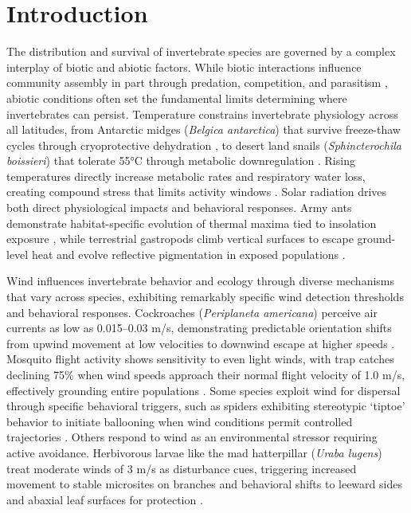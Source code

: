 \section{Introduction}
\label{ch:introduction}

The distribution and survival of invertebrate species are governed by a complex interplay of biotic and abiotic factors. While biotic interactions influence community assembly in part through predation, competition, and parasitism \parencite{blois-heulinDirectIndirectEffects1990,laffertyComparingMechanismsHost2013,miller-terkuilePredatorPreyInteractions2022}, abiotic conditions often set the fundamental limits determining where invertebrates can persist. Temperature constrains invertebrate physiology across all latitudes, from Antarctic midges (\textit{Belgica antarctica}) that survive freeze-thaw cycles through cryoprotective dehydration \parencite{everattResponsesInvertebratesTemperature2015}, to desert land snails (\textit{Sphincterochila boissieri}) that tolerate 55°C through metabolic downregulation \parencite{schweizerSnailsSunStrategies2019}. Rising temperatures directly increase metabolic rates and respiratory water loss, creating compound stress that limits activity windows \parencite{chownWaterLossInsects2011}. Solar radiation drives both direct physiological impacts and behavioral responses. Army ants demonstrate habitat-specific evolution of thermal maxima tied to insolation exposure \parencite{baudierExtremeInsolationClimatic2018}, while terrestrial gastropods climb vertical surfaces to escape ground-level heat and evolve reflective pigmentation in exposed populations \parencite{schweizerSnailsSunStrategies2019}.

Wind influences invertebrate behavior and ecology through diverse mechanisms that vary across species, exhibiting remarkably specific wind detection thresholds and behavioral responses. Cockroaches (\textit{Periplaneta americana}) perceive air currents as low as 0.015--0.03 m/s, demonstrating predictable orientation shifts from upwind movement at low velocities to downwind escape at higher speeds \parencite{bellSearchAnemotacticOrientation1979}. Mosquito flight activity shows sensitivity to even light winds, with trap catches declining 75\% when wind speeds approach their normal flight velocity of 1.0 m/s, effectively grounding entire populations \parencite{bidlingmayerEffectWindVelocity1995}. Some species exploit wind for dispersal through specific behavioral triggers, such as spiders exhibiting stereotypic `tiptoe' behavior to initiate ballooning when wind conditions permit controlled trajectories \parencite{bonteHeritabilitySpiderBallooning2007}. Others respond to wind as an environmental stressor requiring active avoidance. Herbivorous larvae like the mad hatterpillar (\textit{Uraba lugens}) treat moderate winds of 3 m/s as disturbance cues, triggering increased movement to stable microsites on branches and behavioral shifts to leeward sides and abaxial leaf surfaces for protection \parencite{leonardExposureWindAlters2016}.

